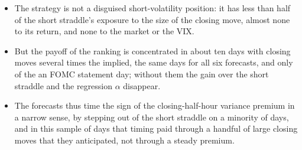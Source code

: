 \begin{itemize}
\begin{itemize}
    monotone across the forecast quintiles, and on these days the straddle earns \rhedLongMidMin--\rhedLongMidMax\%
    of its premium on average (\rhedQFiveR\% in the top forecast quintile, against \rhedHarQFiveR\% on the HAR
    benchmark set).
  \item The strategy is not a disguised short-volatility position: it has less than half of the short straddle's
    exposure to the size of the closing move, almost none to its return, and none to the market or the VIX.
  \item But the payoff of the ranking is concentrated in about ten days with closing moves several times the
    implied, the same days for all six forecasts, and only \rhedBestFomcN{} of the \rhedBestUnion{} an FOMC statement
    day; without them the gain over the short straddle and the regression $\alpha$ disappear.
  \item The forecasts thus time the sign of the closing-half-hour variance premium in a narrow sense, by stepping out
    of the short straddle on a minority of days, and in this sample of \rheSzDays{} days that timing paid through a
    handful of large closing moves that they anticipated, not through a steady premium.
  \end{itemize}
\end{itemize}






